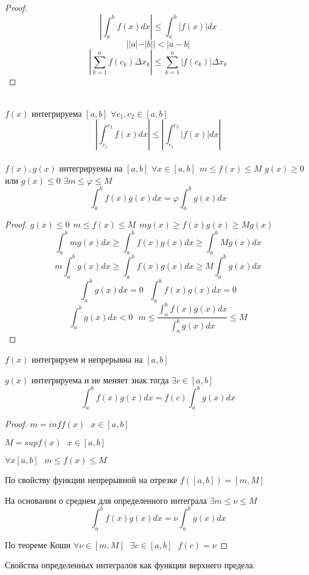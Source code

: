 \begin{proof}
  \[\left| \int_a^b f(x)dx \right| \le \int_a^b |f(x)|dx\]
  \[||a| - |b|| < |a - b|\]
  \[
      \left| \sum_{k=1}^n f(c_k)\Delta x_k \right| \le
      \sum_{k=1}^{n}|f(c_k)|\Delta x_k
  \]
\end{proof}
\\
$f(x)$ интегрируема $[a, b]$ $\forall c_1, c_2 \in [a, b]$
\[
    \left| \int_{c_1}^{c_2} f(x)dx \right| \le
    \left| \int_{c_1}^{c_2} |f(x)|dx \right|
\]
\\
$f(x), g(x)$ интегрируемы на $[a, b]$ $\forall x \in [a, b] ~~
m \le f(x) \le M$ $g(x) \ge 0$ или $g(x) \le 0$ $\exists m \le \varphi \le M$
\[\int_a^b f(x)g(x)dx = \varphi \int_a^b g(x)dx\]
\begin{proof}
    $g(x) \le 0 ~~ m \le f(x) \le M ~~ mg(x) \ge f(x)g(x) \ge Mg(x)$
    \[\int_a^b mg(x)dx \ge \int_a^b f(x)g(x)dx \ge \int_a^b Mg(x)dx\]
    \[m\int_a^b g(x)dx \ge \int_a^b f(x)g(x)dx \ge M\int_a^b g(x)dx\]
    \[\int_a^b g(x)dx = 0 ~~~ \int_a^b f(x)g(x)dx = 0\]
    \[
    \int_a^b g(x)dx < 0 ~~~
    m \le \frac{\int_a^b f(x)g(x)dx}{\int_a^b g(x)dx} \le M
    \]
\end{proof}

\begin{theorem}
  $f(x)$ интегрируем и непрерывна на $[a,b]$

  $g(x)$ интегрируема и не меняет знак тогда $\exists c \in [a,b]$
  \[\int_a^b f(x)g(x)dx  = f(c) \int_a^b g(x)dx\]
\end{theorem}

\begin{proof}
  $m = inf f(x) ~~~ x \in [a,b]$

  $M = sup f(x) ~~~ x \in [a,b]$

  $\forall x [a,b] ~~~ m \le f(x) \le M$

  По свойству функции непрерывной на отрезке $f([a,b]) = [m, M]$

  На основании о среднем для определенного интеграла $\exists m \le \nu \le M$
  $$
  \int_a^b f(x)g(x) dx = \nu \int_a^b g(x) dx
  $$

  По теореме Коши $\forall \nu \in [m,M] ~~~ \exists c \in [a,b] ~~~ f(c) = \nu$
\end{proof}

\begin{title}
  Свойства определенных интегралов как функции верхнего предела.
\end{title}

